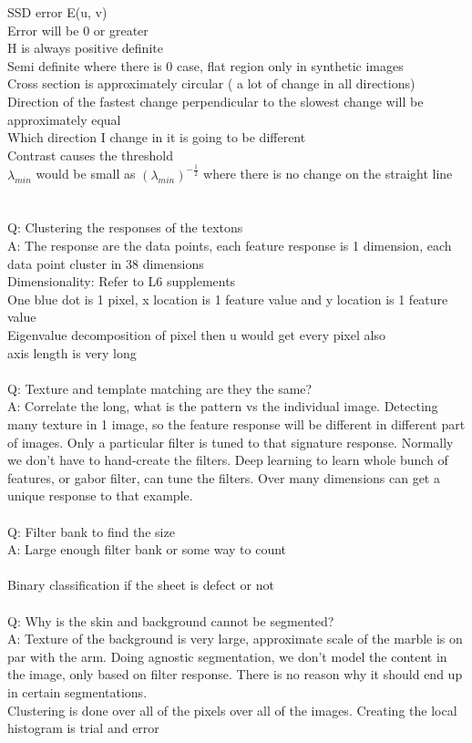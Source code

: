 \documentclass[11pt]{article}
\begin{document}
SSD error E(u, v)\\
Error will be 0 or greater\\
H is always positive definite\\
Semi definite where there is 0 case, flat region only in synthetic images
\\
Cross section is approximately circular ( a lot of change in all directions)\\
Direction of the fastest change perpendicular to the slowest change will be approximately equal\\
Which direction I change in it is going to be different
\\
Contrast causes the threshold\\
$\lambda_{min}$ would be small as $({\lambda_{min}})^{-\frac{1}{2}}$
where there is no change on the straight line \\
\\
\\
Q: Clustering the responses of the textons\\
A: The response are the data points, each feature response is 1 dimension, each data point cluster in 38 dimensions
\\
Dimensionality: Refer to L6 supplements\\
One blue dot is 1 pixel, x location is 1 feature value and y location is 1 feature value
\\
Eigenvalue decomposition of pixel then u would get every pixel also\\
axis length is very long
\\\\
Q: Texture and template matching are they the same?\\
A: Correlate the long, what is the pattern vs the individual image. Detecting many texture in 1 image, so the feature response will be different in different part of images. Only a particular filter is tuned to that signature response. Normally we don't have to hand-create the filters. Deep learning to learn whole bunch of features, or gabor filter, can tune the filters. Over many dimensions can get a unique response to that example.
\\\\
Q: Filter bank to find the size\\
A: Large enough filter bank or some way to count 
\\\\
Binary classification if the sheet is defect or not 
\\\\
Q: Why is the skin and background cannot be segmented?\\
A: Texture of the background is very large, approximate scale of the marble is on par with the arm. Doing agnostic segmentation, we don't model the content in the image, only based on filter response. There is no reason why it should end up in certain segmentations.
\\
Clustering is done over all of the pixels over all of the images. Creating the local histogram is trial and error
\end{document}
